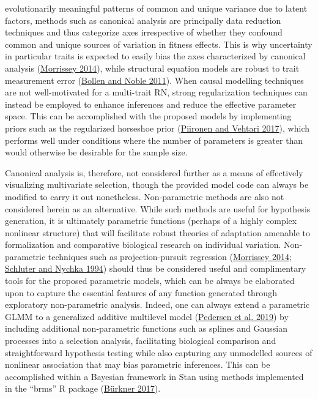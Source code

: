 \documentclass{article}
\begin{document}
evolutionarily meaningful patterns of common and unique variance due to
latent factors, methods such as canonical analysis are principally data
reduction techniques and thus categorize axes irrespective of whether
they confound common and unique sources of variation in fitness effects.
This is why uncertainty in particular traits is expected to easily bias
the axes characterized by canonical analysis
(\protect\hyperlink{ref-Morrissey2014}{Morrissey 2014}), while
structural equation models are robust to trait measurement error
(\protect\hyperlink{ref-Bollen2011}{Bollen and Noble 2011}). When causal
modelling techniques are not well-motivated for a multi-trait RN, strong
regularization techniques can instead be employed to enhance inferences
and reduce the effective parameter space. This can be accomplished with
the proposed models by implementing priors such as the regularized
horseshoe prior (\protect\hyperlink{ref-Piir2017}{Piironen and Vehtari
2017}), which performs well under conditions where the number of
parameters is greater than would otherwise be desirable for the sample
size.

Canonical analysis is, therefore, not considered further as a means of
effectively visualizing multivariate selection, though the provided
model code can always be modified to carry it out nonetheless.
Non-parametric methods are also not considered herein as an alternative.
While such methods are useful for hypothesis generation, it is
ultimately parametric functions (perhaps of a highly complex nonlinear
structure) that will facilitate robust theories of adaptation amenable
to formalization and comparative biological research on individual
variation. Non-parametric techniques such as projection-pursuit
regression (\protect\hyperlink{ref-Morrissey2014}{Morrissey 2014};
\protect\hyperlink{ref-Schluter1994}{Schluter and Nychka 1994}) should
thus be considered useful and complimentary tools for the proposed
parametric models, which can be always be elaborated upon to capture the
essential features of any function generated through exploratory
non-parametric analysis. Indeed, one can always extend a parametric GLMM
to a generalized additive multilevel model
(\protect\hyperlink{ref-Pedersen2019}{Pedersen et al. 2019}) by
including additional non-parametric functions such as splines and
Gaussian processes into a selection analysis, facilitating biological
comparison and straightforward hypothesis testing while also capturing
any unmodelled sources of nonlinear association that may bias parametric
inferences. This can be accomplished within a Bayesian framework in Stan
using methods implemented in the ``brms'' R package
(\protect\hyperlink{ref-brms2017}{Bürkner 2017}).
\end{document}
